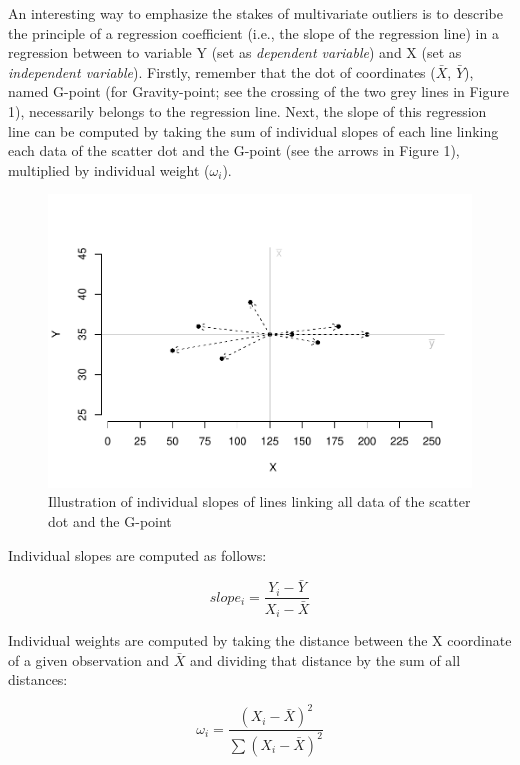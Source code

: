 \documentclass[man,floatsintext]{apa6}
\begin{document}
An interesting way to emphasize the stakes of multivariate outliers is to describe the principle of a regression coefficient (i.e., the slope of the regression line) in a regression between to variable Y (set as \emph{dependent variable}) and X (set as \emph{independent variable}). Firstly, remember that the dot of coordinates (\(\bar {X}\), \(\bar {Y}\)), named G-point (for Gravity-point; see the crossing of the two grey lines in Figure 1), necessarily belongs to the regression line. Next, the slope of this regression line can be computed by taking the sum of individual slopes of each line linking each data of the scatter dot and the G-point (see the arrows in Figure 1), multiplied by individual weight (\(\omega_i\)).

\begin{figure}
\centering
\includegraphics{Outliers_files/figure-latex/individualslopes-1.pdf}
\caption{\label{fig:individualslopes}Illustration of individual slopes of lines linking all data of the scatter dot and the G-point}
\end{figure}

Individual slopes are computed as follows:

\begin{equation} 
slope_i = \frac{Y_i-\bar{Y}}{X_i-\bar{X}}
\label{eq:individualslope}
\end{equation}

Individual weights are computed by taking the distance between the X coordinate of a given observation and \(\bar{X}\) and dividing that distance by the sum of all distances:

\begin{equation} 
\omega_i = \frac{(X_i-\bar{X})^2}{\sum(X_i-\bar{X})^2}
\label{eq:individualslope}
\end{equation}
\end{document}
